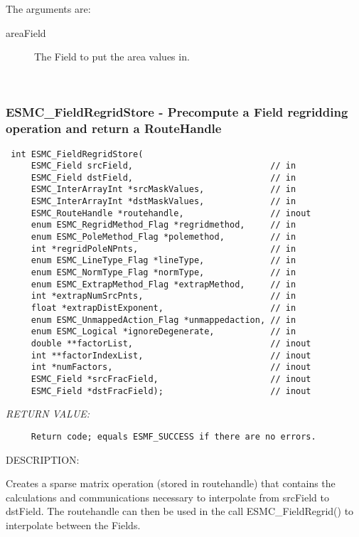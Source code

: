        The arguments are:
       \begin{description}
       \item [areaField]
             The Field to put the area values in. 
       \end{description}
   
 
\mbox{}\hrulefill\ 
 
\subsubsection [ESMC\_FieldRegridStore] {ESMC\_FieldRegridStore - Precompute a Field regridding operation and return a RouteHandle}


  
\begin{verbatim} int ESMC_FieldRegridStore( 
     ESMC_Field srcField,                           // in
     ESMC_Field dstField,                           // in
     ESMC_InterArrayInt *srcMaskValues,             // in
     ESMC_InterArrayInt *dstMaskValues,             // in
     ESMC_RouteHandle *routehandle,                 // inout
     enum ESMC_RegridMethod_Flag *regridmethod,     // in
     enum ESMC_PoleMethod_Flag *polemethod,         // in
     int *regridPoleNPnts,                          // in
     enum ESMC_LineType_Flag *lineType,             // in
     enum ESMC_NormType_Flag *normType,             // in
     enum ESMC_ExtrapMethod_Flag *extrapMethod,     // in
     int *extrapNumSrcPnts,                         // in
     float *extrapDistExponent,                     // in
     enum ESMC_UnmappedAction_Flag *unmappedaction, // in
     enum ESMC_Logical *ignoreDegenerate,           // in
     double **factorList,                           // inout
     int **factorIndexList,                         // inout
     int *numFactors,                               // inout
     ESMC_Field *srcFracField,                      // inout
     ESMC_Field *dstFracField);                     // inout
 \end{verbatim}{\em RETURN VALUE:}
\begin{verbatim}     Return code; equals ESMF_SUCCESS if there are no errors.\end{verbatim}
{\sf DESCRIPTION:\\ }


  
     Creates a sparse matrix operation (stored in routehandle) that contains 
     the calculations and communications necessary to interpolate from srcField 
     to dstField. The routehandle can then be used in the call ESMC\_FieldRegrid() 
     to interpolate between the Fields. 
  
